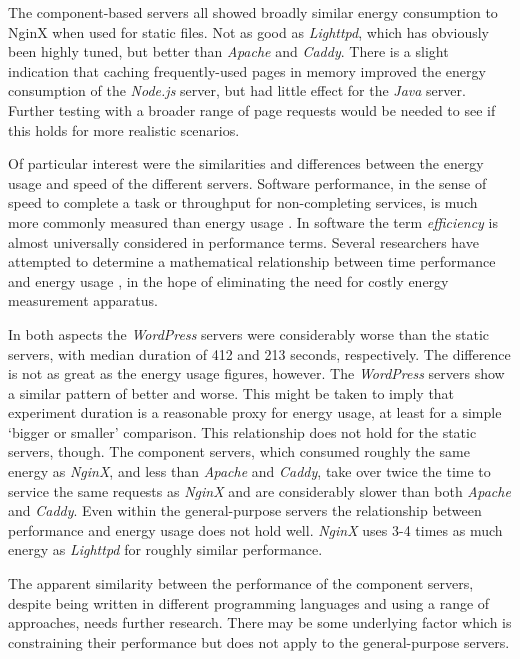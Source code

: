 The component-based servers all showed broadly similar energy consumption to NginX when used for static files. Not as good as \emph{Lighttpd}, which has obviously been highly tuned, but better than \emph{Apache} and \emph{Caddy}. There is a slight indication that caching frequently-used pages in memory improved the energy consumption of the \emph{Node.js} server, but had little effect for the \emph{Java} server. Further testing with a broader range of page requests would be needed to see if this holds for more realistic scenarios.

Of particular interest were the similarities and differences between the energy usage and speed of the different servers. Software performance, in the sense of speed to complete a task or throughput for non-completing services, is much more commonly measured than energy usage \citep{Freitas2014} \citep{Kuber2023}. In software the term \emph{efficiency} is almost universally considered in performance terms. Several researchers have attempted to determine a mathematical relationship between time performance and energy usage \citep{Kalaitzoglou2014a} \citep{Stoico2023}, in the hope of eliminating the need for costly energy measurement apparatus.

In both aspects the \emph{WordPress} servers were considerably worse than the static servers, with median duration of 412 and 213 seconds, respectively. The difference is not as great as the energy usage figures, however. The \emph{WordPress} servers show a similar pattern of better and worse. This might be taken to imply that experiment duration is a reasonable proxy for energy usage, at least for a simple `bigger or smaller' comparison. This relationship does not hold for the static servers, though. The component servers, which consumed roughly the same energy as \emph{NginX}, and less than \emph{Apache} and \emph{Caddy}, take over twice the time to service the same requests as \emph{NginX} and are considerably slower than both \emph{Apache} and \emph{Caddy}. Even within the general-purpose servers the relationship between performance and energy usage does not hold well. \emph{NginX} uses 3-4 times as much energy as \emph{Lighttpd} for roughly similar performance.

The apparent similarity between the performance of the component servers, despite being written in different programming languages and using a range of approaches, needs further research. There may be some underlying factor which is constraining their performance but does not apply to the general-purpose servers.


